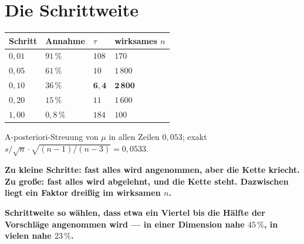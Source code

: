 \section{Die Schrittweite}

\begin{merksatz}
\begin{center}
{\small
\renewcommand{\arraystretch}{1.48}
\begin{tabular}{@{}P{1.6cm}P{2.2cm}P{1.6cm}P{2.2cm}@{}}
\toprule
\textbf{Schritt} & \textbf{Annahme} & $\tau$ & \textbf{wirksames $n$}\\
\midrule
$0{,}01$ & $91\,\%$ & $108$ & $170$\\
$0{,}05$ & $61\,\%$ & $10$ & $1\,800$\\
$0{,}10$ & $36\,\%$ & $\mathbf{6{,}4}$ & $\mathbf{2\,800}$\\
$0{,}20$ & $15\,\%$ & $11$ & $1\,600$\\
$1{,}00$ & $0{,}8\,\%$ & $184$ & $100$\\
\bottomrule
\end{tabular}}
\end{center}
A-posteriori-Streuung von $\mu$ in allen Zeilen $0{,}053$; exakt $s/\sqrt n\cdot\sqrt{(n-1)/(n-3)} = 0{,}0533$.

\begin{center}
\begin{minipage}{0.9\textwidth}
\textbf{Zu kleine Schritte: fast alles wird angenommen, aber die Kette kriecht. Zu große: fast alles wird abgelehnt, und die Kette steht. Dazwischen liegt ein Faktor dreißig im wirksamen $n$.}
\end{minipage}
\end{center}

\begin{center}
\begin{minipage}{0.9\textwidth}
\textbf{Schrittweite so wählen, dass etwa ein Viertel bis die Hälfte der Vorschläge angenommen wird --- in einer Dimension nahe $45\,\%$, in vielen nahe $23\,\%$.}
\end{minipage}
\end{center}

\begin{center}
\begin{minipage}{0.88\textwidth}
\end{minipage}
\end{center}
\end{merksatz}

